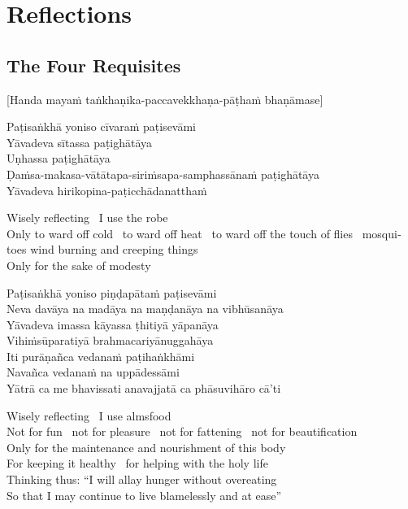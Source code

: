 
\chapter{Reflections}

\section{The Four Requisites}
\label{four-requisites}

\begin{center}
  [Handa mayaṁ taṅkhaṇika-paccavekkhaṇa-pāṭhaṁ bhaṇāmase]
\end{center}

Paṭisaṅkhā yoniso cīvaraṁ paṭisevāmi\\
Yāvadeva sītassa paṭighātāya\\
Uṇhassa paṭighātāya\\
Ḍaṁsa-makasa-vātātapa-siriṁsapa-samphassānaṁ paṭighātāya\\
Yāvadeva hirikopina-paṭicchādanatthaṁ

\begin{english}
  Wisely reflecting \breathmark\ I use the robe\\
  Only to ward off cold \breathmark\ to ward off heat \breathmark\ to ward off the touch of flies \breathmark\ mosquitoes wind burning and creeping things\\
  Only for the sake of modesty
\end{english}

Paṭisaṅkhā yoniso piṇḍapātaṁ paṭisevāmi\\
Neva davāya na madāya na maṇḍanāya na vibhūsanāya\\
Yāvadeva imassa kāyassa ṭhitiyā yāpanāya\\
Vihiṁsūparatiyā brahmacariyānuggahāya\\
Iti purāṇañca vedanaṁ paṭihaṅkhāmi\\
Navañca vedanaṁ na uppādessāmi\\
Yātrā ca me bhavissati anavajjatā ca phāsuvihāro cā’ti

\begin{english}
  Wisely reflecting \breathmark\ I use almsfood\\
  Not for fun \breathmark\ not for pleasure \breathmark\ not for fattening \breathmark\ not for beautification\\
  Only for the maintenance and nourishment of this body\\
  For keeping it healthy \breathmark\ for helping with the holy life\\
  Thinking thus: “I will allay hunger without overeating\\
  So that I may continue to live blamelessly and at ease”
\end{english}

